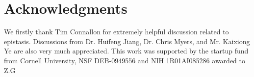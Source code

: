 \section{Acknowledgments}

We firstly thank Tim Connallon for extremely helpful discussion
related to epistasis. Discussions from Dr. Huifeng Jiang, Dr. Chris
Myers, and Mr. Kaixiong Ye are also very much appreciated. This work
was supported by the startup fund from Cornell University, NSF
DEB-0949556 and NIH 1R01AI085286 awarded to Z.G

